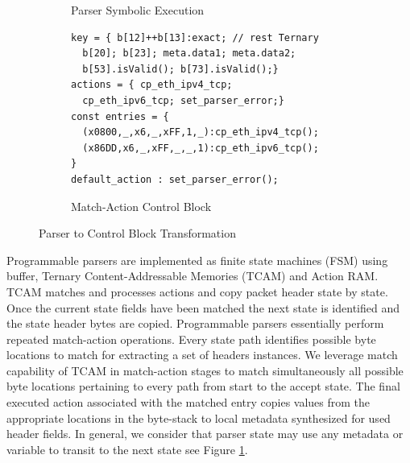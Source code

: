 \documentclass[letterpaper,twocolumn,10pt]{article}
\begin{document}
\begin{figure}[!ht]
\begin{subfigure}[b]{0.26\linewidth}
        \caption{Parser Symbolic Execution}
        \label{subfig:parser-symbolic-execution}
    \end{subfigure}
    \begin{subfigure}[b]{.47\linewidth}
    \centering
    \begin{lstlisting}[frame=none]
key = { b[12]++b[13]:exact; // rest Ternary
  b[20]; b[23]; meta.data1; meta.data2;
  b[53].isValid(); b[73].isValid();}
actions = { cp_eth_ipv4_tcp;
  cp_eth_ipv6_tcp; set_parser_error;}
const entries = {
  (x0800,_,x6,_,xFF,1,_):cp_eth_ipv4_tcp();
  (x86DD,x6,_,xFF,_,_,1):cp_eth_ipv6_tcp();
}
default_action : set_parser_error();
\end{lstlisting}
\vspace*{-10pt}
\caption{Match-Action Control Block}
\label{subfig:parser-mat}
\end{subfigure}
\caption{Parser to Control Block Transformation}
\label{fig:parser-to-control-block-transformation}
\end{figure}

Programmable parsers \cite{6665172} are implemented as finite state machines (FSM) using buffer, Ternary Content-Addressable Memories (TCAM) and Action RAM. 
TCAM matches and processes actions and copy packet header state by state. Once the current state fields have been matched the next state is identified and the state header bytes are copied.  
Programmable parsers essentially perform repeated match-action operations.
Every state path identifies possible byte locations to match for extracting a set of headers instances.
We leverage match capability of TCAM in match-action stages to match simultaneously all possible byte locations pertaining to every path from start to the accept state.
The final executed action associated with the matched entry copies values from the appropriate locations in the byte-stack to local metadata synthesized for used header fields. In general, we consider that parser state may use any metadata or variable to transit to the next state see Figure \ref{subfig:parser-symbolic-execution}. 
\end{document}
